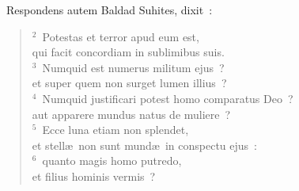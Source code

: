 ~\lettrine[lines=10,image=true,loversize=0.05,lraise=-0.03]{R}{}espondens autem Baldad Suhites, dixit~:
\begin{flushleft}\begin{verse}\vspace{6pt}${}^{2}$~Potestas et terror apud eum est,\\ qui facit concordiam in sublimibus suis.\\
${}^{3}$~Numquid est numerus militum ejus~?\\ et super quem non surget lumen illius~?\\
${}^{4}$~Numquid justificari potest homo comparatus Deo~?\\ aut apparere mundus natus de muliere~?\\
${}^{5}$~Ecce luna etiam non splendet,\\ et stell\ae\ non sunt mund\ae\ in conspectu ejus~:\\
${}^{6}$~quanto magis homo putredo,\\ et filius hominis vermis~?\end{verse}\end{flushleft}


